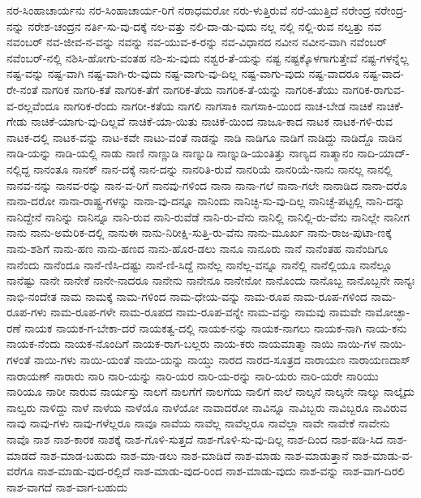 {ನರ-ಸಿಂಹಾಚಾರ್ಯನು
ನರ-ಸಿಂಹಾಚಾರ್ಯ-ರಿಗೆ
ನರಾಧಮರೋ
ನರು-ಳುತ್ತಿರುವೆ
ನರೆ-ಯುತ್ತಿದೆ
ನರೇಂದ್ರ
ನರೇಂದ್ರ-ನನ್ನು
ನರೇಶ-ಚಂದ್ರನ
ನರ್ತಿ-ಸು-ವು-ದಕ್ಕೆ
ನಲ-ವತ್ತು
ನಲಿ-ದಾ-ಡು-ವುದು
ನಲ್ಲ
ನಲ್ಲಿ
ನಲ್ಲಿ-ರುವ
ನಲ್ವತ್ತು
ನವ
ನವಂಬರ್
ನವ-ಜೀವ-ನ-ವನ್ನು
ನವನ್ನು
ನವ-ಯುವ-ಕ-ರನ್ನು
ನವ-ವಿಧಾನದ
ನವೀನ
ನವೀನ-ವಾಗಿ
ನವೆಂಬರ್
ನವೆಂಬರ್-ನಲ್ಲಿ
ನಶಿಸಿ-ಹೋಗು-ವಂತಹ
ನಶಿ-ಸು-ವುದು
ನಶ್ವರ-ತೆ-ಯನ್ನು
ನಷ್ಟ
ನಷ್ಟಕ್ಕೊಳಗಾಗುತ್ತೇವೆ
ನಷ್ಟ-ಗಳನ್ನೆಲ್ಲ
ನಷ್ಟ-ವನ್ನು
ನಷ್ಟ-ವಾಗಿ
ನಷ್ಟ-ವಾಗಿ-ರು-ವುದು
ನಷ್ಟ-ವಾಗು-ವು-ದಿಲ್ಲ
ನಷ್ಟ-ವಾಗು-ವುದು
ನಷ್ಟ-ವಾದರೂ
ನಷ್ಟ-ವಾದ-ರೇ-ನಂತೆ
ನಾಗರಿಕ
ನಾಗರಿ-ಕತೆ
ನಾಗರಿಕ-ತೆಗೆ
ನಾಗರಿಕ-ತೆಯ
ನಾಗರಿಕ-ತೆ-ಯನ್ನು
ನಾಗರಿಕ-ತೆಯು
ನಾಗರಿಕ-ರಾಗುವ-ವ-ರಲ್ಲವೆಂದೂ
ನಾಗರಿಕ-ರೆಂದು
ನಾಗರೀ-ಕತೆಯ
ನಾಗಲಿ
ನಾಗಸಾಕಿ
ನಾಗಸಾಕಿ-ಯಿಂದ
ನಾಚ-ಬೇಡ
ನಾಚಿಕೆ
ನಾಚಿಕೆ-ಗೇಡು
ನಾಚಿಕೆ-ಯಾಗು-ವು-ದಿಲ್ಲವೆ
ನಾಚಿಕೆ-ಯಾ-ಯಿತು
ನಾಚಿಕೆ-ಯಿಂದ
ನಾಜೂ-ಕಾದ
ನಾಟಕ
ನಾಟಕ-ಗಳಿ-ರುವ
ನಾಟಕ-ದಲ್ಲಿ
ನಾಟಕ-ವನ್ನು
ನಾಟ-ಕವೇ
ನಾಟು-ವಂತೆ
ನಾಡನ್ನು
ನಾಡಿ
ನಾಡಿಗೂ
ನಾಡಿಗೆ
ನಾಡಿದ್ದು
ನಾಡಿದ್ದೊ
ನಾಡಿನ
ನಾಡಿ-ಯನ್ನು
ನಾಡಿ-ಯಲ್ಲಿ
ನಾಡು
ನಾಣಿ
ನಾಣ್ಣುಡಿ
ನಾಣ್ನುಡಿ
ನಾಣ್ನುಡಿ-ಯಂತಿತ್ತು
ನಾಣ್ಯದ
ನಾತ್ಮಾನಂ
ನಾದಿ-ಯಾದ್-ನಲ್ಲಿದ್ದ
ನಾನಂತೂ
ನಾನಕ್
ನಾನ-ದಕ್ಕೆ
ನಾನ-ದನ್ನು
ನಾನರಿತಿ-ರುವೆ
ನಾನರಿಯೆ
ನಾನರಿಯೆ-ನಾನು
ನಾನಲ್ಲ
ನಾನಲ್ಲಿ
ನಾನವ-ನನ್ನು
ನಾನವ-ರನ್ನು
ನಾನ-ವ-ರಿಗೆ
ನಾನವು-ಗಳಿಂದ
ನಾನಾ
ನಾನಾ-ಗಲೆ
ನಾನಾ-ಗಲೇ
ನಾನಾಡಿದ
ನಾನಾ-ದರೊ
ನಾನಾ-ದರೋ
ನಾನಾ-ರಾಷ್ಟ್ರ-ಗಳನ್ನು
ನಾನಾ-ವು-ದನ್ನೂ
ನಾನಿಂದು
ನಾನಿಚ್ಛಿ-ಸು-ವು-ದಿಲ್ಲ
ನಾನಿಚ್ಛೆ-ಪಟ್ಟಲ್ಲಿ
ನಾನಿ-ದನ್ನು
ನಾನಿದ್ದೇನೆ
ನಾನಿನ್ನು
ನಾನಿನ್ನೂ
ನಾನಿ-ರುವ
ನಾನಿ-ರುವೆಡೆ
ನಾನಿ-ರು-ವೆನು
ನಾನಿಲ್ಲಿ
ನಾನಿಲ್ಲಿ-ರು-ವೆನು
ನಾನಿಲ್ಲೇ
ನಾನೀಗ
ನಾನು
ನಾನು-ಅಮೆರಿಕ-ದಲ್ಲಿ
ನಾನುಈ
ನಾನು-ನಿರೀಕ್ಷಿ-ಸುತ್ತಿ-ರು-ವೆನು
ನಾನು-ಮೂರ್ಖ
ನಾನು-ರಾಜ-ಪುಟಾ-ಣಕ್ಕೆ
ನಾನು-ಶಶಿಗೆ
ನಾನು-ಹಣ
ನಾನು-ಹಣದ
ನಾನು-ಹೊರ-ಡಲು
ನಾನೂ
ನಾನೂರು
ನಾನೆ
ನಾನೆಂತಹ
ನಾನೆಂದಿಗೂ
ನಾನೆಂದು
ನಾನೆಂದೂ
ನಾನೆ-ಣಿಸಿ-ದಷ್ಟು
ನಾನೆ-ಣಿ-ಸಿದ್ದೆ
ನಾನೆಲ್ಲ
ನಾನೆಲ್ಲ-ವನ್ನೂ
ನಾನೆಲ್ಲಿ
ನಾನೆಲ್ಲಿಯೂ
ನಾನೆಲ್ಲೂ
ನಾನೆಷ್ಟು
ನಾನೇ
ನಾನೇಕೆ
ನಾನೇ-ನಾದರೂ
ನಾನೇನು
ನಾನೇನೂ
ನಾನೇನೋ
ನಾನೊಂದು
ನಾನೊಬ್ಬ
ನಾನೊಬ್ಬನೇ
ನಾನ್ಯಃ
ನಾಭಿ-ನಂದೇತ
ನಾಮ
ನಾಮಕ್ಕೆ
ನಾಮ-ಗಳಿಂದ
ನಾಮ-ಧೇಯ-ವನ್ನು
ನಾಮ-ರೂಪ
ನಾಮ-ರೂಪ-ಗಳಿಂದ
ನಾಮ-ರೂಪ-ಗಳು
ನಾಮ-ರೂಪ-ಗಳೇ
ನಾಮ-ರೂಪದ
ನಾಮ-ರೂಪ-ವನ್ನೇ
ನಾಮ-ವನ್ನು
ನಾಮವು
ನಾಮವೇ
ನಾಮೋಚ್ಛಾ-ರಣೆ
ನಾಯಕ
ನಾಯಕ-ಗ-ಬೇಕಾ-ದರೆ
ನಾಯಕತ್ವ-ದಲ್ಲಿ
ನಾಯಕ-ನನ್ನು
ನಾಯಕ-ನಾಗಲು
ನಾಯಕ-ನಾಗಿ
ನಾಯ-ಕನು
ನಾಯಕ-ನೆಂದು
ನಾಯಕ-ನೊಂದಿಗೆ
ನಾಯಕ-ರಾಗ-ಬಲ್ಲರು
ನಾಯ-ಕರು
ನಾಯಮಾತ್ಮಾ
ನಾಯಿ
ನಾಯಿ-ಗಳ
ನಾಯಿ-ಗಳಂತೆ
ನಾಯಿ-ಗಳು
ನಾಯಿ-ಯಂತೆ
ನಾಯಿ-ಯನ್ನು
ನಾಯ್ಡು
ನಾರದ
ನಾರದ-ಸೂತ್ರದ
ನಾರಾಯಣ
ನಾರಾಯಣದಾಸ್
ನಾರಾಯಣ್
ನಾರಾರು
ನಾರಿ
ನಾರಿ-ಯನ್ನು
ನಾರಿ-ಯರ
ನಾರಿ-ಯ-ರನ್ನು
ನಾರಿ-ಯರು
ನಾರಿ-ಯರೇ
ನಾರಿಯು
ನಾರಿಯೂ
ನಾರೀ
ನಾರುವ
ನಾರ್ಯಸ್ತು
ನಾಲಗೆ
ನಾಲಗೆಗೆ
ನಾಲಗೆಯ
ನಾಲಿಗೆ
ನಾಲೆ
ನಾಲ್ಕನೆ
ನಾಲ್ಕನೇ
ನಾಲ್ಕು
ನಾಲ್ಕೈದು
ನಾಲ್ವರು
ನಾಳಿದ್ದು
ನಾಳೆ
ನಾಳೆಯ
ನಾಳೆಯೊ
ನಾಳೆಯೋ
ನಾವಾದರೋ
ನಾವಿನ್ನೂ
ನಾವಿಬ್ಬರು
ನಾವಿಬ್ಬರೂ
ನಾವಿರುವ
ನಾವು
ನಾವು-ಗಳು
ನಾವು-ಗಳೆಲ್ಲರೂ
ನಾವೂ
ನಾವೆಯ
ನಾವೆಲ್ಲ
ನಾವೆಲ್ಲರೂ
ನಾವೆಲ್ಲಾ
ನಾವೇ
ನಾವೇಕೆ
ನಾವೇನು
ನಾವೊ
ನಾಶ
ನಾಶ-ಕಾರಕ
ನಾಶಕ್ಕೆ
ನಾಶ-ಗೊಳಿ-ಸುತ್ತದೆ
ನಾಶ-ಗೊಳಿ-ಸು-ವು-ದಿಲ್ಲ
ನಾಶ-ದಿಂದ
ನಾಶ-ಪಡಿ-ಸಿದ
ನಾಶ-ಮಾಡದೆ
ನಾಶ-ಮಾಡ-ಬಹುದು
ನಾಶ-ಮಾ-ಡಲು
ನಾಶ-ಮಾಡಿದೆ
ನಾಶ-ಮಾಡು
ನಾಶ-ಮಾಡುತ್ತಾನೆ
ನಾಶ-ಮಾಡು-ವ-ವರೆಗೂ
ನಾಶ-ಮಾಡು-ವುದ-ರಲ್ಲಿದೆ
ನಾಶ-ಮಾಡು-ವುದ-ರಿಂದ
ನಾಶ-ಮಾಡು-ವುದು
ನಾಶ-ವನ್ನು
ನಾಶ-ವಾಗ-ದಿರಲಿ
ನಾಶ-ವಾಗದೆ
ನಾಶ-ವಾಗ-ಬಹುದು
}
